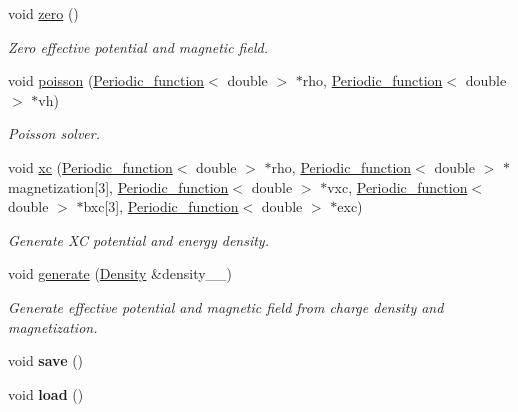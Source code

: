 \begin{DoxyCompactItemize}
\item 
void \hyperlink{classsirius_1_1_potential_a45701c46c8961f2ea5c089286802cf47}{zero} ()
\begin{DoxyCompactList}\small\item\em Zero effective potential and magnetic field. \end{DoxyCompactList}\item 
void \hyperlink{classsirius_1_1_potential_ada6c62c577c4e91e06490423345e833a}{poisson} (\hyperlink{classsirius_1_1_periodic__function}{Periodic\+\_\+function}$<$ double $>$ $\ast$rho, \hyperlink{classsirius_1_1_periodic__function}{Periodic\+\_\+function}$<$ double $>$ $\ast$vh)
\begin{DoxyCompactList}\small\item\em Poisson solver. \end{DoxyCompactList}\item 
void \hyperlink{classsirius_1_1_potential_a1abe0a0486f01331b8baf7a359523ae6}{xc} (\hyperlink{classsirius_1_1_periodic__function}{Periodic\+\_\+function}$<$ double $>$ $\ast$rho, \hyperlink{classsirius_1_1_periodic__function}{Periodic\+\_\+function}$<$ double $>$ $\ast$magnetization\mbox{[}3\mbox{]}, \hyperlink{classsirius_1_1_periodic__function}{Periodic\+\_\+function}$<$ double $>$ $\ast$vxc, \hyperlink{classsirius_1_1_periodic__function}{Periodic\+\_\+function}$<$ double $>$ $\ast$bxc\mbox{[}3\mbox{]}, \hyperlink{classsirius_1_1_periodic__function}{Periodic\+\_\+function}$<$ double $>$ $\ast$exc)
\begin{DoxyCompactList}\small\item\em Generate X\+C potential and energy density. \end{DoxyCompactList}\item 
void \hyperlink{classsirius_1_1_potential_abddbb842b28ba0f62653393aca53b4e7}{generate} (\hyperlink{classsirius_1_1_density}{Density} \&density\+\_\+\+\_\+)
\begin{DoxyCompactList}\small\item\em Generate effective potential and magnetic field from charge density and magnetization. \end{DoxyCompactList}\item 
\hypertarget{classsirius_1_1_potential_a476007fa356fb79d01cf829a69b26430}{}void {\bfseries save} ()\label{classsirius_1_1_potential_a476007fa356fb79d01cf829a69b26430}

\item 
\hypertarget{classsirius_1_1_potential_a4531df46202e7c0495ff7a389351486d}{}void {\bfseries load} ()\label{classsirius_1_1_potential_a4531df46202e7c0495ff7a389351486d}


\end{DoxyCompactItemize}
